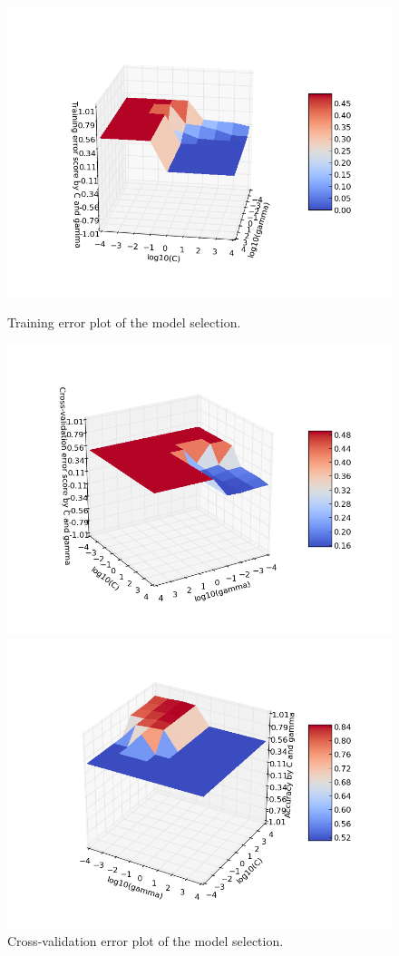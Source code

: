 \documentclass[aps,letterpaper,10pt]{revtex4}
\begin{document}
\begin{figure}[]
  \includegraphics[width=\linewidth]{img/tr_err_graph.png}
  \caption{Training error plot of the model selection.}\label{fig:4}
\endminipage\hfill
{}
  \includegraphics[width=\linewidth]{img/cv_err_graph.png}
  \caption{Cross-validation error plot of the model selection.}\label{fig:5}
\endminipage\hfill
{}%
  \includegraphics[width=\linewidth]{img/acc_graph.png}

\end{figure}
\end{document}
